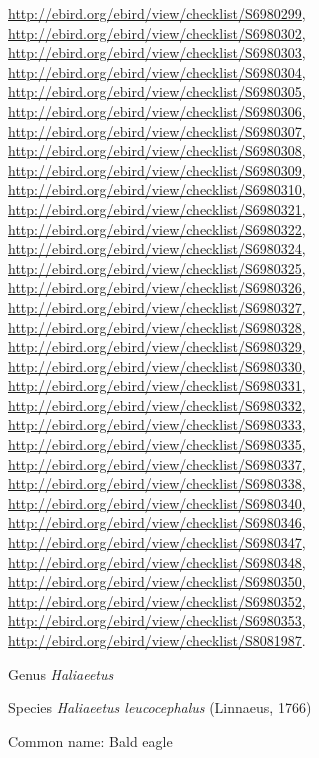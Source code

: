 \documentclass[9pt, article]{memoir}
\begin{document}
\begin{multicols}{2}
\url{http://ebird.org/ebird/view/checklist/S6980299}, 
\url{http://ebird.org/ebird/view/checklist/S6980302}, 
\url{http://ebird.org/ebird/view/checklist/S6980303}, 
\url{http://ebird.org/ebird/view/checklist/S6980304}, 
\url{http://ebird.org/ebird/view/checklist/S6980305}, 
\url{http://ebird.org/ebird/view/checklist/S6980306}, 
\url{http://ebird.org/ebird/view/checklist/S6980307}, 
\url{http://ebird.org/ebird/view/checklist/S6980308}, 
\url{http://ebird.org/ebird/view/checklist/S6980309}, 
\url{http://ebird.org/ebird/view/checklist/S6980310}, 
\url{http://ebird.org/ebird/view/checklist/S6980321}, 
\url{http://ebird.org/ebird/view/checklist/S6980322}, 
\url{http://ebird.org/ebird/view/checklist/S6980324}, 
\url{http://ebird.org/ebird/view/checklist/S6980325}, 
\url{http://ebird.org/ebird/view/checklist/S6980326}, 
\url{http://ebird.org/ebird/view/checklist/S6980327}, 
\url{http://ebird.org/ebird/view/checklist/S6980328}, 
\url{http://ebird.org/ebird/view/checklist/S6980329}, 
\url{http://ebird.org/ebird/view/checklist/S6980330}, 
\url{http://ebird.org/ebird/view/checklist/S6980331}, 
\url{http://ebird.org/ebird/view/checklist/S6980332}, 
\url{http://ebird.org/ebird/view/checklist/S6980333}, 
\url{http://ebird.org/ebird/view/checklist/S6980335}, 
\url{http://ebird.org/ebird/view/checklist/S6980337}, 
\url{http://ebird.org/ebird/view/checklist/S6980338}, 
\url{http://ebird.org/ebird/view/checklist/S6980340}, 
\url{http://ebird.org/ebird/view/checklist/S6980346}, 
\url{http://ebird.org/ebird/view/checklist/S6980347}, 
\url{http://ebird.org/ebird/view/checklist/S6980348}, 
\url{http://ebird.org/ebird/view/checklist/S6980350}, 
\url{http://ebird.org/ebird/view/checklist/S6980352}, 
\url{http://ebird.org/ebird/view/checklist/S6980353}, 
\url{http://ebird.org/ebird/view/checklist/S8081987}.

\vspace{6pt}\noindent\hspace{30pt}Genus \textit{Haliaeetus}


\vspace{6pt}\noindent\hspace{36pt}Species \textit{Haliaeetus leucocephalus} (Linnaeus, 1766)


Common name: Bald eagle


\end{multicols}
\end{document}

